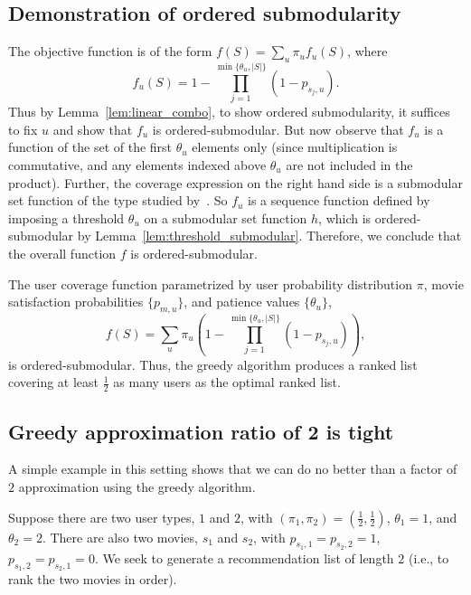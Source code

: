 \subsection{Demonstration of ordered submodularity}
The objective function is of the form $f(S) = \sum_u \pi_u f_u(S)$, where $$f_u(S) = 1 - \prod_{j=1}^{\min \{\theta_u, |S|\}} (1 - p_{s_j, u}).$$ Thus by Lemma~\ref{lem:linear_combo}, to show ordered submodularity, it suffices to fix $u$ and show that $f_u$ is ordered-submodular. But now observe that $f_u$ is a function of the set of the first $\theta_u$ elements only (since multiplication is commutative, and any elements indexed above $\theta_u$ are not included in the product). Further, the coverage expression on the right hand side is a submodular set function of the type studied by~\cite{agrawal2009}. So $f_u$ is a sequence function defined by imposing a threshold $\theta_u$ on a submodular set function $h$, which is ordered-submodular by Lemma~\ref{lem:threshold_submodular}. Therefore, we conclude that the overall function $f$ is ordered-submodular. 

\begin{thm}
The user coverage function parametrized by user probability distribution $\pi$, movie satisfaction probabilities $\{p_{m,u}\}$, and patience values $\{\theta_u\}$, $$f(S) = \sum_u \pi_u \left(1 - \prod_{j=1}^{\min \{\theta_u, |S|\}} (1 - p_{s_j, u}) \right),$$ is ordered-submodular. Thus, the greedy algorithm produces a ranked list covering at least $\frac{1}{2}$ as many users as the optimal ranked list.
\end{thm}


\subsection{Greedy approximation ratio of 2 is tight}
A simple example in this setting shows that we can do no better than a factor of $2$ approximation using the greedy algorithm.

Suppose there are two user types, $1$ and $2$, with $(\pi_1, \pi_2) = \left(\frac{1}{2}, \frac{1}{2}\right)$, $\theta_1 = 1$, and $\theta_2 = 2$. There are also two movies, $s_1$ and $s_2$, with $p_{s_1, 1} = p_{s_2, 2} = 1$, $p_{s_1, 2} = p_{s_2, 1} = 0$. We seek to generate a recommendation list of length $2$ (i.e., to rank the two movies in order).

